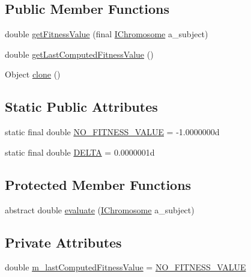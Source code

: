 \subsection*{Public Member Functions}
\begin{DoxyCompactItemize}
\item 
double \hyperlink{classorg_1_1jgap_1_1_fitness_function_a05fff0534d3cfdccd1d4d96d8ba6dda2}{get\-Fitness\-Value} (final \hyperlink{interfaceorg_1_1jgap_1_1_i_chromosome}{I\-Chromosome} a\-\_\-subject)
\item 
double \hyperlink{classorg_1_1jgap_1_1_fitness_function_adc5e20816cb3fd6f3486adb53b1e563d}{get\-Last\-Computed\-Fitness\-Value} ()
\item 
Object \hyperlink{classorg_1_1jgap_1_1_fitness_function_aa47c6f886479efc5ed5fe84eb7f9b5ca}{clone} ()
\end{DoxyCompactItemize}
\subsection*{Static Public Attributes}
\begin{DoxyCompactItemize}
\item 
static final double \hyperlink{classorg_1_1jgap_1_1_fitness_function_a5f1f23e6f8a0f9606aee5d52fac6a06b}{N\-O\-\_\-\-F\-I\-T\-N\-E\-S\-S\-\_\-\-V\-A\-L\-U\-E} = -\/1.\-0000000d
\item 
static final double \hyperlink{classorg_1_1jgap_1_1_fitness_function_a89cbf1ef4c08655f209ce69fde6731e7}{D\-E\-L\-T\-A} = 0.\-0000001d
\end{DoxyCompactItemize}
\subsection*{Protected Member Functions}
\begin{DoxyCompactItemize}
\item 
abstract double \hyperlink{classorg_1_1jgap_1_1_fitness_function_a0078e42480eac93729f906ac4dc185d9}{evaluate} (\hyperlink{interfaceorg_1_1jgap_1_1_i_chromosome}{I\-Chromosome} a\-\_\-subject)
\end{DoxyCompactItemize}
\subsection*{Private Attributes}
\begin{DoxyCompactItemize}
\item 
double \hyperlink{classorg_1_1jgap_1_1_fitness_function_a80e29e5b948a1a6ed10c94965abf79a7}{m\-\_\-last\-Computed\-Fitness\-Value} = \hyperlink{classorg_1_1jgap_1_1_fitness_function_a5f1f23e6f8a0f9606aee5d52fac6a06b}{N\-O\-\_\-\-F\-I\-T\-N\-E\-S\-S\-\_\-\-V\-A\-L\-U\-E}
\end{DoxyCompactItemize}

